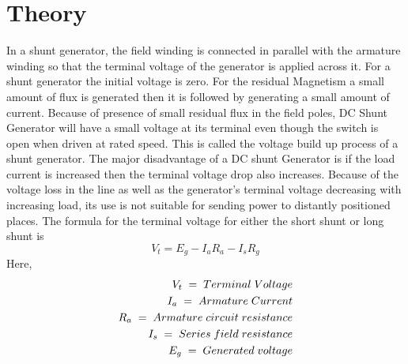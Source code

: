 \section{Theory}
In a shunt generator, the field winding is connected in parallel with the armature winding so that the terminal voltage of the generator is applied across it. For a shunt generator the initial voltage is zero. For the residual Magnetism a small amount of flux is generated then it is followed by generating a small amount of current. Because of presence of small residual flux in the field poles, DC Shunt Generator will have a small voltage at its terminal even though the switch is open when driven at rated speed. This is called the voltage build up process of a shunt generator. The major disadvantage of a DC shunt Generator is if the load current is increased then the terminal voltage drop also increases. Because of the voltage loss in the line as well as the generator's terminal voltage decreasing with increasing load, its use is not suitable for sending power to distantly positioned places. The formula for the terminal voltage for either the short shunt or long shunt is 
\begin{equation}
    \nonumber
    V_t = E_g - I_aR_a - I_sR_g
\end{equation}
Here,
\begin{align}
    \nonumber
    V_t\hspace{0.1cm} =\hspace{0.1cm} Terminal\hspace{0.1cm} Voltage
    \\\nonumber
    I_a\hspace{0.1cm} =\hspace{0.1cm} Armature\hspace{0.1cm} Current
    \\\nonumber
    R_a \hspace{0.1cm}= \hspace{0.1cm}Armature\hspace{0.1cm} circuit\hspace{0.1cm} resistance
    \\\nonumber
    I_s\hspace{0.1cm} =\hspace{0.1cm} Series\hspace{0.1cm} field\hspace{0.1cm} resistance
    \\\nonumber
    E_g \hspace{0.1cm}=\hspace{0.1cm} Generated\hspace{0.1cm} voltage
\end{align}
